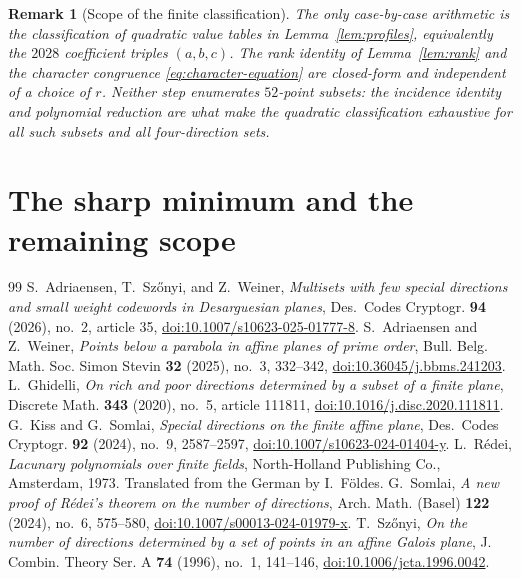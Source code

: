 \documentclass[10pt,a4paper]{amsart}
\newtheorem{remark}[theorem]{Remark}
\begin{document}
\begin{remark}[Scope of the finite classification]
The only case-by-case arithmetic is the classification of quadratic value
tables in Lemma~\ref{lem:profiles}, equivalently the $2028$ coefficient
triples $(a,b,c)$.  The rank identity of Lemma~\ref{lem:rank} and the
character congruence \eqref{eq:character-equation} are closed-form and
independent of a choice of $r$.  Neither step enumerates $52$-point subsets:
the incidence identity and polynomial reduction are what make the quadratic
classification exhaustive for all such subsets and all four-direction sets.
\end{remark}

\section{The sharp minimum and the remaining scope}\label{sec:consequences}


\begin{thebibliography}{99}
 S.~Adriaensen, T.~Sz\H{o}nyi, and Z.~Weiner, \emph{Multisets with few special directions and small weight codewords in Desarguesian planes}, Des.\ Codes Cryptogr. \textbf{94} (2026), no.~2, article 35, \href{https://doi.org/10.1007/s10623-025-01777-8} {doi:10.1007/s10623-025-01777-8}.
 S.~Adriaensen and Z.~Weiner, \emph{Points below a parabola in affine planes of prime order}, Bull. Belg. Math. Soc. Simon Stevin \textbf{32} (2025), no.~3, 332--342, \href{https://doi.org/10.36045/j.bbms.241203} {doi:10.36045/j.bbms.241203}.
 L.~Ghidelli, \emph{On rich and poor directions determined by a subset of a finite plane}, Discrete Math. \textbf{343} (2020), no.~5, article 111811, \href{https://doi.org/10.1016/j.disc.2020.111811} {doi:10.1016/j.disc.2020.111811}.
 G.~Kiss and G.~Somlai, \emph{Special directions on the finite affine plane}, Des.\ Codes Cryptogr. \textbf{92} (2024), no.~9, 2587--2597, \href{https://doi.org/10.1007/s10623-024-01404-y} {doi:10.1007/s10623-024-01404-y}.
 L.~R\'edei, \emph{Lacunary polynomials over finite fields}, North-Holland Publishing Co., Amsterdam, 1973. Translated from the German by I.~F\"oldes.
 G.~Somlai, \emph{A new proof of R\'edei's theorem on the number of directions}, Arch. Math. (Basel) \textbf{122} (2024), no.~6, 575--580, \href{https://doi.org/10.1007/s00013-024-01979-x} {doi:10.1007/s00013-024-01979-x}.
 T.~Sz\H{o}nyi, \emph{On the number of directions determined by a set of points in an affine Galois plane}, J. Combin. Theory Ser. A \textbf{74} (1996), no.~1, 141--146, \href{https://doi.org/10.1006/jcta.1996.0042} {doi:10.1006/jcta.1996.0042}.
\end{thebibliography}
\end{document}

